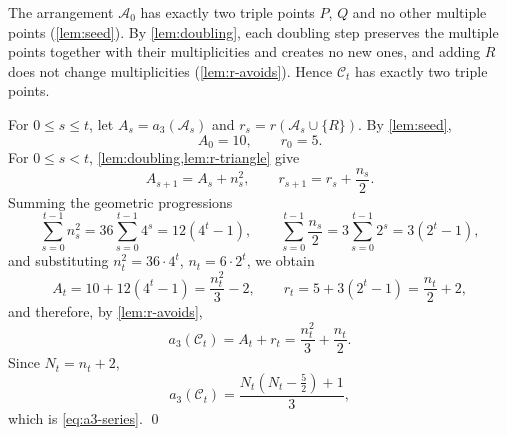 The arrangement $\mathcal A_0$ has exactly two triple points $P$, $Q$ and no other multiple points (\cref{lem:seed}). By \cref{lem:doubling}, each doubling step preserves the multiple points together with their multiplicities and creates no new ones, and adding $R$ does not change multiplicities (\cref{lem:r-avoids}). Hence $\mathcal C_t$ has exactly two triple points.

For $0\le s\le t$, let $A_s=a_3(\mathcal A_s)$ and $r_s=r(\mathcal A_s\cup\{R\})$. By \cref{lem:seed},
\[
A_0=10,
\qquad
r_0=5.
\]
For $0\le s<t$, \cref{lem:doubling,lem:r-triangle} give
\[
A_{s+1}=A_s+n_s^2,
\qquad
r_{s+1}=r_s+\frac{n_s}{2}.
\]
Summing the geometric progressions
\[
\sum_{s=0}^{t-1}n_s^2=36\sum_{s=0}^{t-1}4^s=12\left(4^t-1\right),
\qquad
\sum_{s=0}^{t-1}\frac{n_s}2=3\sum_{s=0}^{t-1}2^s=3\left(2^t-1\right),
\]
and substituting $n_t^2=36\cdot4^t$, $n_t=6\cdot2^t$, we obtain
\[
A_t=10+12\left(4^t-1\right)=\frac{n_t^2}{3}-2,
\qquad
r_t=5+3\left(2^t-1\right)=\frac{n_t}{2}+2,
\]
and therefore, by \cref{lem:r-avoids},
\[
a_3(\mathcal C_t)=A_t+r_t
=\frac{n_t^2}{3}+\frac{n_t}{2}.
\]
Since $N_t=n_t+2$,
\[
a_3(\mathcal C_t)=
\frac{N_t(N_t-\frac52)+1}{3},
\]
which is \eqref{eq:a3-series}. \qed

